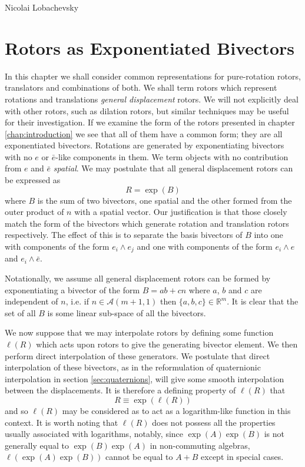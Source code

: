 \begin{savequote}
%
{Nicolai Lobachevsky}%
\end{savequote}

\chapter{Rotors as Exponentiated Bivectors}
\label{chap:exponential}

In this chapter we shall consider common representations for pure-rotation
rotors, translators and combinations of both. We shall term rotors which
represent rotations and translations \emph{general displacement} rotors. We
will not explicitly deal with other rotors, such as dilation rotors, but
similar techniques may be useful for their investigation.  If we examine the
form of the rotors presented in chapter \ref{chap:introduction} we see that
all of them have a common form; they are all exponentiated bivectors.
Rotations are generated by exponentiating bivectors with no
$e$ or $\bar{e}$-like components in them. We term objects with no contribution
from $e$ and $\bar{e}$ \emph{spatial}.
We may
postulate that all general displacement rotors can be expressed as
\[
R = \exp(B)
\]
where $B$ is the sum of two bivectors, one spatial and
the other formed from the outer product of
$n$ with a spatial vector. Our justification is that those closely match
the form of the bivectors which generate rotation and translation rotors 
respectively. The effect of this is to separate the basis bivectors of $B$
into one with components of the form $e_i \wedge e_j$ and one with components
of the form $e_i \wedge e$ and $e_i \wedge \bar{e}$.

Notationally, we assume all general displacement rotors can be formed by
exponentiating a bivector of the form $B = ab + cn$ where $a$, $b$ and $c$ are
independent of $n$, i.e. if $n \in \mathcal{A}(m+1,1)$ then $\{a,b,c\} \in
\mathbb{R}^m$.  It is clear that the set of all $B$ is some linear sub-space
of all the bivectors.

We now suppose that we may interpolate rotors by defining some function
$\ell(R)$ which acts upon rotors to give the generating bivector element. We
then perform direct interpolation of these generators.  We postulate that
direct interpolation of these bivectors, as in the reformulation of
quaternionic interpolation in section \ref{sec:quaternions}, will give some
smooth interpolation between the displacements.  It is therefore a defining
property of $\ell(R)$ that
\begin{equation}
R \equiv \exp(\ell(R))
\end{equation}
and so $\ell(R)$ may be considered as to act as a logarithm-like function in
this context.  It is worth noting that $\ell(R)$ does not possess all the
properties usually associated with logarithms, notably, since
$\exp(A)\exp(B)$ is not generally equal to $\exp(B)\exp(A)$ in non-commuting
algebras, $\ell(\exp(A)\exp(B))$ cannot be equal to $A + B$ except in special
cases.

